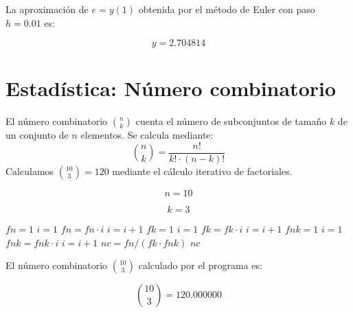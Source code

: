 \documentclass{article}
\begin{document}
La aproximación de $e = y(1)$ obtenida por el método de Euler con paso $h = 0.01$ es:

\begin{equation}
    y =
    2.704814
    \label{eq:res:y}
\end{equation}


\section{Estadística: Número combinatorio}

El número combinatorio $\binom{n}{k}$ cuenta el número de subconjuntos de tamaño
$k$ de un conjunto de $n$ elementos. Se calcula mediante:
\[
    \binom{n}{k} = \frac{n!}{k! \cdot (n-k)!}
\]
Calculamos $\binom{10}{3} = 120$ mediante el cálculo iterativo de factoriales.

\begin{equation}
    n = 10
    \label{eq:calc:n}
\end{equation}

\begin{equation}
    k = 3
    \label{eq:calc:k}
\end{equation}

\begin{algorithm}
\caption{Cálculo de $\binom{n}{k}$ mediante factoriales iterativos}
\begin{algorithmic}
    \STATE $fn = 1$
    \STATE $i = 1$
        \STATE $fn = fn \cdot i$
        \STATE $i = i + 1$
    \ENDWHILE
    \STATE $fk = 1$
    \STATE $i = 1$
        \STATE $fk = fk \cdot i$
        \STATE $i = i + 1$
    \ENDWHILE
    \STATE $fnk = 1$
    \STATE $i = 1$
        \STATE $fnk = fnk \cdot i$
        \STATE $i = i + 1$
    \ENDWHILE
    \STATE $nc = fn / (fk \cdot fnk)$
    \RETURN $nc$
\end{algorithmic}
\end{algorithm}

El número combinatorio $\binom{10}{3}$ calculado por el programa es:

\begin{equation}
    \binom{10}{3} =
    120.000000
    \label{eq:res:nc}
\end{equation}

\end{document}
